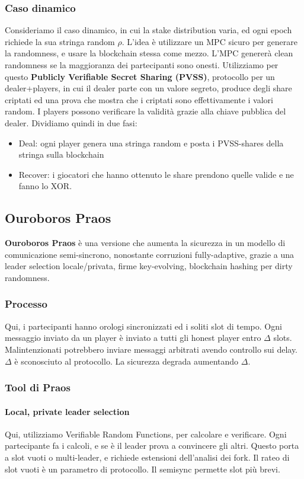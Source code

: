 \documentclass[11pt]{article}
\begin{document}
\subsubsection{Caso dinamico}
Consideriamo il caso dinamico, in cui la stake distribution varia, ed ogni epoch richiede la sua stringa random $\rho$. L'idea è utilizzare un MPC sicuro per generare la randomness, e usare la blockchain stessa come mezzo. L'MPC genererà clean randomness se la maggioranza dei partecipanti sono onesti. Utilizziamo per questo \textbf{Publicly Verifiable Secret Sharing (PVSS)}, protocollo per un dealer+players, in cui il dealer parte con un valore segreto, produce degli share criptati ed una prova che mostra che i criptati sono effettivamente i valori random. I players possono verificare la validità grazie alla chiave pubblica del dealer. Dividiamo quindi in due fasi:
\begin{itemize}
    \item Deal: ogni player genera una stringa random e posta i PVSS-shares della stringa sulla blockchain 
    \item Recover: i giocatori che hanno ottenuto le share prendono quelle valide e ne fanno lo XOR.
\end{itemize}

\subsection{Ouroboros Praos}
\textbf{Ouroboros Praos} è una versione che aumenta la sicurezza in un modello di comunicazione semi-sincrono, nonostante corruzioni fully-adaptive, grazie a una leader selection locale/privata, firme key-evolving, blockchain hashing per dirty randomness. 
\subsubsection{Processo}
Qui, i partecipanti hanno orologi sincronizzati ed i soliti slot di tempo. Ogni messaggio inviato da un player è inviato a tutti gli honest player entro $\Delta$ slots. Malintenzionati potrebbero inviare messaggi arbitrati avendo controllo sui delay. $\Delta$ è sconosciuto al protocollo. La sicurezza degrada aumentando $\Delta$. 
\subsubsection{Tool di Praos}
\paragraph{Local, private leader selection} Qui, utilizziamo Verifiable Random Functions, per calcolare e verificare. Ogni partecipante fa i calcoli, e se è il leader prova a convincere gli altri.
Questo porta a slot vuoti o multi-leader, e richiede estensioni dell'analisi dei fork. Il rateo di slot vuoti è un parametro di protocollo. Il semisync permette slot più brevi.
\end{document}
